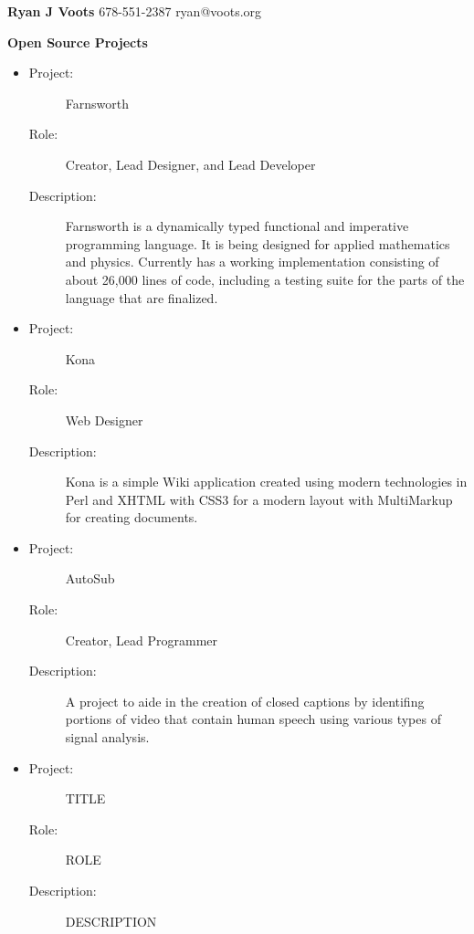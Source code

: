 \documentclass{resume}
\begin{document}
\textbf{Ryan J Voots}
678-551-2387
ryan@voots.org

\vspace{0.1in}

{\large \textbf{Open Source Projects}}
	\begin{itemize}
	\item
		\begin{description}
		\item[Project:] Farnsworth 
		\item[Role:] Creator, Lead Designer, and Lead Developer 
		\item[Description:] Farnsworth is a dynamically typed functional and imperative programming language.  It is being designed for applied mathematics and physics.  Currently has a working implementation consisting of about 26,000 lines of code, including a testing suite for the parts of the language that are finalized.
		\end{description}

        \item
                \begin{description}
                \item[Project:] Kona
                \item[Role:] Web Designer
                \item[Description:] Kona is a simple Wiki application created using modern technologies in Perl and XHTML with CSS3 for a modern layout with MultiMarkup for creating documents.
		\end{description}

        \item
                \begin{description}  
                \item[Project:] AutoSub
                \item[Role:] Creator, Lead Programmer
                \item[Description:] A project to aide in the creation of closed captions by identifing portions of video that contain human speech using various types of signal analysis.
                \end{description}

	\item
                \begin{description}
                \item[Project:] TITLE
                \item[Role:] ROLE
                \item[Description:] DESCRIPTION
		\end{description}

	\end{itemize}
\end{document}
